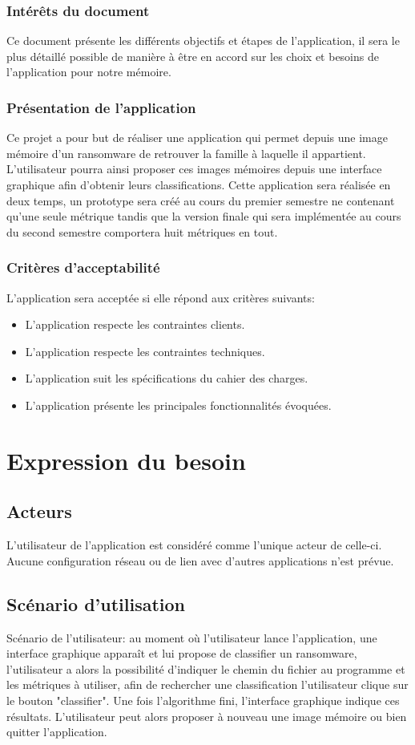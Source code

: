 \documentclass[a4paper, 12pt, twoside]{article}
\begin{document}
\subsubsection{Intérêts du document}
Ce document présente les différents objectifs et étapes de l'application, il sera le plus détaillé possible de manière à être en accord sur les choix et besoins de l'application pour notre mémoire.
\subsubsection{Présentation de l'application}
Ce projet a pour but de réaliser une application qui permet depuis une image mémoire d’un ransomware de retrouver la famille à laquelle il appartient. L'utilisateur  pourra ainsi proposer ces images mémoires depuis une interface graphique afin d'obtenir leurs classifications. Cette application sera réalisée en deux temps, un prototype sera créé au cours du premier semestre ne contenant qu’une seule métrique tandis que la version finale qui sera implémentée au cours du second semestre comportera huit métriques en tout.
\subsubsection{Critères d'acceptabilité}
L'application sera acceptée si elle répond aux critères suivants:
\begin{itemize}
\item L'application respecte les contraintes clients.
\item L'application respecte les contraintes techniques.
\item L'application suit les spécifications du cahier des charges.
\item L'application présente les principales fonctionnalités évoquées.
\end{itemize}
\newpage
\section{Expression du besoin}
\subsection{Acteurs}
L’utilisateur de l’application est considéré comme l’unique acteur de celle-ci. Aucune configuration réseau ou de lien avec d'autres applications n'est prévue.
\subsection{Scénario d'utilisation}
\large Scénario de l'utilisateur:
au moment où l'utilisateur lance l'application, une interface graphique apparaît et lui propose de classifier un ransomware, l'utilisateur a alors la possibilité d'indiquer le chemin du fichier au programme et les métriques à utiliser, afin de rechercher une classification l'utilisateur clique sur le bouton "classifier". Une fois l'algorithme fini, l'interface graphique indique ces résultats.
L'utilisateur peut alors proposer à nouveau une image mémoire ou bien quitter l'application.
\end{document}
